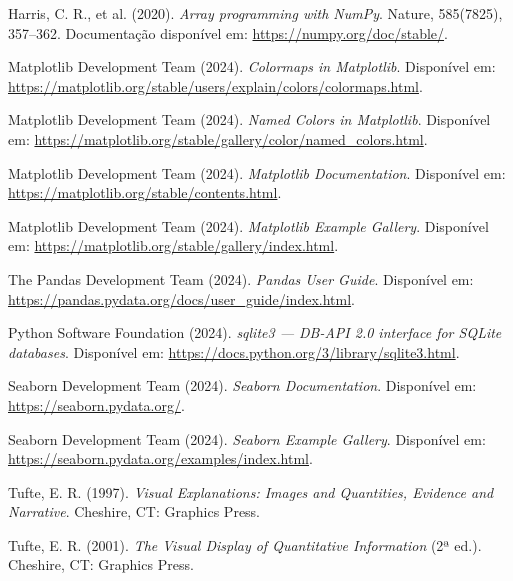\documentclass{article}
\begin{document}
\begin{thebibliography}{99}

Harris, C. R., et al. (2020). \textit{Array programming with NumPy}. Nature, 585(7825), 357–362. Documentação disponível em: \url{https://numpy.org/doc/stable/}.

Matplotlib Development Team (2024). \textit{Colormaps in Matplotlib}. Disponível em: \url{https://matplotlib.org/stable/users/explain/colors/colormaps.html}.

Matplotlib Development Team (2024). \textit{Named Colors in Matplotlib}. Disponível em: \url{https://matplotlib.org/stable/gallery/color/named_colors.html}.

Matplotlib Development Team (2024). \textit{Matplotlib Documentation}. Disponível em: \url{https://matplotlib.org/stable/contents.html}.

Matplotlib Development Team (2024). \textit{Matplotlib Example Gallery}. Disponível em: \url{https://matplotlib.org/stable/gallery/index.html}.

The Pandas Development Team (2024). \textit{Pandas User Guide}. Disponível em: \url{https://pandas.pydata.org/docs/user_guide/index.html}.

Python Software Foundation (2024). \textit{sqlite3 — DB-API 2.0 interface for SQLite databases}. Disponível em: \url{https://docs.python.org/3/library/sqlite3.html}.

Seaborn Development Team (2024). \textit{Seaborn Documentation}. Disponível em: \url{https://seaborn.pydata.org/}.

Seaborn Development Team (2024). \textit{Seaborn Example Gallery}. Disponível em: \url{https://seaborn.pydata.org/examples/index.html}.

Tufte, E. R. (1997). \textit{Visual Explanations: Images and Quantities, Evidence and Narrative}. Cheshire, CT: Graphics Press.

Tufte, E. R. (2001). \textit{The Visual Display of Quantitative Information} (2ª ed.). Cheshire, CT: Graphics Press.

\end{thebibliography}
\end{document}
